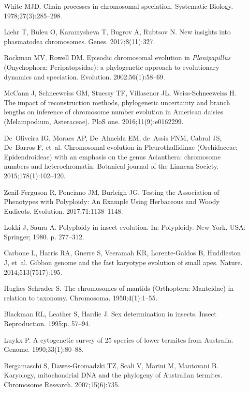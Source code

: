 \documentclass[]{rsos}%
\begin{document}
\begin{thebibliography}{99}
White MJD.
 Chain processes in chromosomal speciation.
 Systematic Biology. 1978;27(3):285--298.
 
Liehr T, Buleu O, Karamysheva T, Bugrov A, Rubtsov N.
 New insights into phasmatodea chromosomes.
Genes. 2017;8(11):327.

Rockman MV, Rowell DM.
 Episodic chromosomal evolution in \emph{{P}lanipapillus}
  ({O}nychophora: {P}eripatopsidae): a phylogenetic approach to evolutionary
  dynamics and speciation.
 Evolution. 2002;56(1):58--69.

McCann J, Schneeweiss GM, Stuessy TF, Villasenor JL, Weiss-Schneeweiss H.
 The impact of reconstruction methods, phylogenetic uncertainty and
  branch lengths on inference of chromosome number evolution in American
  daisies (Melampodium, Asteraceae).
 PloS one. 2016;11(9):e0162299.

De~Oliveira IG, Moraes AP, De~Almeida EM, de~Assis FNM, Cabral JS, De~Barros F,
  et~al.
 Chromosomal evolution in Pleurothallidinae (Orchidaceae:
  Epidendroideae) with an emphasis on the genus Acianthera: chromosome numbers
  and heterochromatin.
 Botanical journal of the Linnean Society. 2015;178(1):102--120.

Zenil-Ferguson R, Ponciano JM, Burleigh JG.
 Testing the Association of Phenotypes with Polyploidy: An Example
  Using Herbaceous and Woody Eudicots.
 Evolution. 2017;71:1138--1148.

Lokki J, Saura A.
 Polyploidy in insect evolution.
 In: Polyploidy. New York, USA: Springer; 1980. p. 277--312.

Carbone L, Harris RA, Gnerre S, Veeramah KR, Lorente-Galdos B, Huddleston J,
  et~al.
 Gibbon genome and the fast karyotype evolution of small apes.
 Nature. 2014;513(7517):195.

Hughes-Schrader S.
 The chromosomes of mantids (Orthoptera: Manteidae) in relation to
  taxonomy.
 Chromosoma. 1950;4(1):1--55.

Blackman RL, Leather S, Hardie J.
 Sex determination in insects.
 Insect Reproduction. 1995;p. 57--94.

Luykx P.
 A cytogenetic survey of 25 species of lower termites from Australia.
Genome. 1990;33(1):80--88.

Bergamaschi S, Dawes-Gromadzki TZ, Scali V, Marini M, Mantovani B.
 Karyology, mitochondrial DNA and the phylogeny of Australian
  termites.
Chromosome Research. 2007;15(6):735.


\end{thebibliography}
\end{document}
